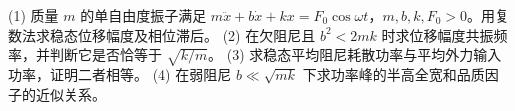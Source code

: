(1) 质量 \(m\) 的单自由度振子满足 \(m\ddot x+b\dot x+kx=F_0\cos\omega t\)，\(m,b,k,F_0>0\)。用复数法求稳态位移幅度及相位滞后。
(2) 在欠阻尼且 \(b^2<2mk\) 时求位移幅度共振频率，并判断它是否恰等于 \(\sqrt{k/m}\)。
(3) 求稳态平均阻尼耗散功率与平均外力输入功率，证明二者相等。
(4) 在弱阻尼 \(b\ll\sqrt{mk}\) 下求功率峰的半高全宽和品质因子的近似关系。
